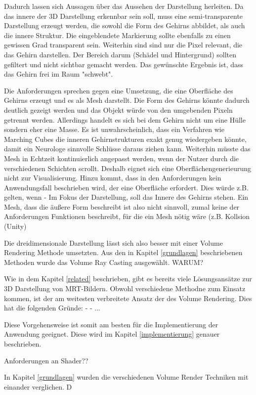 Dadurch lassen sich Aussagen über das Aussehen der Darstellung herleiten.
Da das innere der 3D Darstellung erkennbar sein soll, muss eine semi-transparente Darstellung erzeugt werden, die sowohl die Form des Gehirns abbildet, als auch die innere Struktur. Die eingeblendete Markierung sollte ebenfalls zu einen gewissen Grad transparent sein.
Weiterhin sind sind nur die Pixel relevant, die das Gehirn darstellen. Der Bereich darum (Schädel und Hintergrund) sollten gefiltert  und nicht sichtbar gemacht werden. Das gewünschte Ergebnis ist, dass das Gehirn frei im Raum "schwebt". 

Die Anforderungen sprechen gegen eine Umsetzung, die eine Oberfläche des Gehirns erzeugt und es als Mesh darstellt. Die Form des Gehirns könnte dadurch deutlich gezeigt werden und das Objekt würde von den umgebenden Pixeln getrennt werden. 
Allerdings handelt es sich bei dem Gehirn nicht um eine Hülle sondern eher eine Masse. Es ist unwahrscheinlich, dass ein Verfahren wie Marching Cubes die inneren Gehirnstrukturen exakt genug wiedergeben könnte, damit ein Neurologe sinnvolle Schlüsse daraus ziehen kann. Weiterhin müsste das Mesh in Echtzeit kontinuierlich angepasst werden, wenn der Nutzer durch die verschiedenen Schichten scrollt. 
Deshalb eignet sich eine Oberflächengenerieurung nicht zur Visualisierung.
Hinzu kommt, dass in den Anforderungen kein Anwendungsfall beschrieben wird, der eine Oberfläche erfordert. Dies würde z.B. gelten, wenn 	
	- Im Fokus der Darstellung, soll das Innere des Gehirns stehen. Ein Mesh, dass die äußere Form beschreibt ist also nicht sinnvoll, zumal keine der Anforderungen Funktionen beschreibt, für die ein Mesh nötig wäre (z.B. Kollsion (Unity)
	
Die dreidimensionale Darstellung lässt sich also besser mit einer Volume Rendering Methode umsetzten. 
Aus den in Kapitel \ref{grundlagen} beschriebenen Methoden wurde das Volume Ray Casting ausgewählt. 
WARUM?

Wie in dem Kapitel \ref{related} beschrieben, gibt es bereits viele Lösungsansätze zur 3D Darstellung von MRT-Bildern. Obwohl verschiedene Methodne zum Einsatz kommen, ist der am weitesten verbreitete Ansatz der des Volume Rendering.
Dies hat die folgenden Gründe:
- 
- ...
	
Diese Vorgehensweise ist somit am besten für die Implementierung der Anwendung geeignet.
Diese wird im Kapitel \ref{implementierung} genauer beschrieben.

Anforderungen an Shader??

In Kapitel \ref{grundlagen} wurden die verschiedenen Volume Render Techniken mit einander verglichen. D

